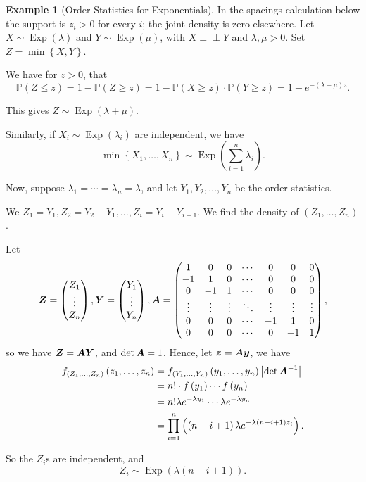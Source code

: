 \documentclass[11pt]{article}
\numberwithin{equation}{section}
\theoremstyle{definition}
\newtheorem{example}[theorem]{Example}
\theoremstyle{remark}
\newcommand{\pqty}[1]{\left(#1\right)}
\newcommand{\Bqty}[1]{\left\{#1\right\}}
\newcommand{\abs}[1]{\left|#1\right|}
\newcommand{\Prob}{\mathbb P}
\newcommand{\indp}{\mathrel{\perp\!\!\!\perp}}
\newcommand{\Exponential}{\operatorname{Exp}}
\newcommand{\pmqty}[1]{\begin{pmatrix}#1\end{pmatrix}}
\begin{document}
\begin{example}[Order Statistics for Exponentials]\label{probability-example-039}
    \label{probability-ex:order-statistics-exp}%
In the spacings calculation below the support is \(z_i>0\) for every \(i\); the joint density is zero elsewhere.
    Let \(X \sim \Exponential \pqty{\lambda}\) and \(Y \sim \Exponential \pqty{\mu}\), with \(X \indp Y\) and \(\lambda, \mu > 0\). Set \(Z = \min\Bqty{X, Y}\).

    We have for \(z > 0\), that
    \[
        \Prob\pqty{Z \leq z} = 1 - \Prob\pqty{Z \geq z} = 1 - \Prob\pqty{X \geq z} \cdot \Prob\pqty{Y \geq z} = 1 - e^{- \pqty{\lambda + \mu} z}.
    \]

    This gives \(Z \sim \Exponential\pqty{\lambda + \mu}\).

    Similarly, if \(X_i \sim \Exponential \pqty{\lambda_i}\) are independent, we have
    \[
        \min\Bqty{X_1, \ldots, X_n} \sim \Exponential\pqty{\sum_{i = 1}^{n} \lambda_i}.
    \]

    Now, suppose \(\lambda_1 = \cdots = \lambda_n = \lambda\), and let \(Y_1, Y_2, \ldots, Y_n\) be the order statistics.

    We \(Z_1 = Y_1, Z_2 = Y_2 - Y_1, \ldots, Z_i = Y_i - Y_{i - 1}\). We find the density of \(\pqty{Z_1, \ldots, Z_n}\).

    Let
    \[
        \vb{Z} = \pmqty{Z_1 \\ \vdots \\ Z_n},
        \vb{Y} = \pmqty{Y_1 \\ \vdots \\ Y_n},
        \vb{A} = \pmqty{
             1 &  0 & 0 & \cdots &  0 &  0 &  0 \\
            -1 &  1 & 0 & \cdots &  0 &  0 &  0 \\
             0 & -1 & 1 & \cdots &  0 &  0 &  0 \\
             \vdots & \vdots & \vdots & \ddots & \vdots & \vdots & \vdots \\
             0 &  0 & 0 & \cdots & -1 &  1 & 0 \\
             0 &  0 & 0 & \cdots &  0 & -1 & 1
        },
    \]
    so we have \(\vb{Z} = \vb{A} \vb{Y}\), and \(\det \vb{A} = 1\). Hence, let \(\vb{z} = \vb{A} \vb{y}\), we have
    \begin{align*}
        f_{\pqty{Z_1, \ldots, Z_n}} \pqty{z_1, \ldots, z_n} &= f_{\pqty{Y_1, \ldots, Y_n}} \pqty{y_1, \ldots, y_n} \abs{\det \vb{A}^{-1}} \\
        &= n! \cdot f\pqty{y_1} \cdots f\pqty{y_n} \\
        &= n! \lambda e^{-\lambda y_1} \cdots \lambda e^{-\lambda y_n} \\
        &= \prod_{i = 1}^{n} \pqty{\pqty{n - i + 1} \lambda e^{-\lambda \pqty{n - i + 1} z_i}}.
    \end{align*}

    So the \(Z_i\)s are independent, and
    \[
        Z_i \sim \Exponential\pqty{\lambda \pqty{n - i + 1}}.
    \]
\end{example}
\end{document}
